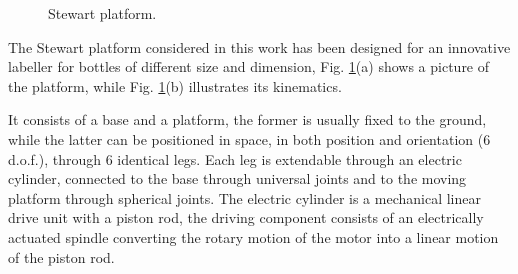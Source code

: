 \documentclass[]{interact}
\theoremstyle{plain}%
\theoremstyle{definition}
\theoremstyle{remark}
\begin{document}
{\begin{figure}
{}
\caption{Stewart platform.} \label{Fig:Stewart_platform_picture}
\end{figure}
The Stewart platform considered in this work has been designed for an innovative labeller for bottles of different size and dimension, Fig. \ref{Fig:Stewart_platform_picture}(a) shows a picture of the platform, while Fig. \ref{Fig:Stewart_platform_picture}(b) illustrates its kinematics.

It consists of a base and a platform, the former is usually fixed to the ground, while the latter can be positioned in space, in both position and orientation (6 d.o.f.), through 6 identical legs. Each leg is extendable through an electric cylinder, connected to the base through universal joints and to the moving platform through spherical joints. The electric cylinder is a mechanical linear drive unit with a piston rod, the driving component consists of an electrically actuated spindle converting the rotary motion of the motor into a linear motion of the piston rod.

}
\end{document}
